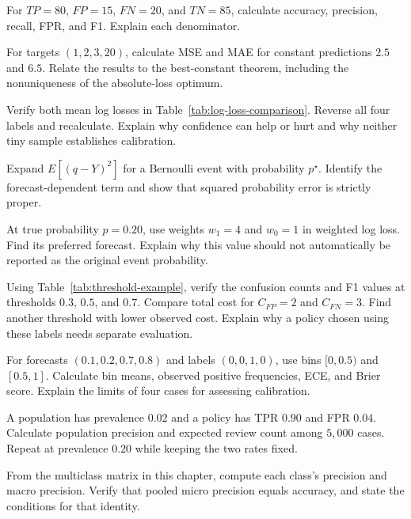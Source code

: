 \begin{exercises}
\item {}For $TP=80$, $FP=15$, $FN=20$, and $TN=85$, calculate accuracy, precision, recall, FPR, and F1. Explain each denominator.
\item {}For targets $(1,2,3,20)$, calculate MSE and MAE for constant predictions $2.5$ and $6.5$. Relate the results to the best-constant theorem, including the nonuniqueness of the absolute-loss optimum.
\item {}Verify both mean log losses in Table~\ref{tab:log-loss-comparison}. Reverse all four labels and recalculate. Explain why confidence can help or hurt and why neither tiny sample establishes calibration.
\item {}Expand $E[(q-Y)^2]$ for a Bernoulli event with probability $p^\star$. Identify the forecast-dependent term and show that squared probability error is strictly proper.
\item {}At true probability $p=0.20$, use weights $w_1=4$ and $w_0=1$ in weighted log loss. Find its preferred forecast. Explain why this value should not automatically be reported as the original event probability.
\item {}Using Table~\ref{tab:threshold-example}, verify the confusion counts and F1 values at thresholds $0.3$, $0.5$, and $0.7$. Compare total cost for $C_{FP}=2$ and $C_{FN}=3$. Find another threshold with lower observed cost. Explain why a policy chosen using these labels needs separate evaluation.
\item {}For forecasts $(0.1,0.2,0.7,0.8)$ and labels $(0,0,1,0)$, use bins $[0,0.5)$ and $[0.5,1]$. Calculate bin means, observed positive frequencies, ECE, and Brier score. Explain the limits of four cases for assessing calibration.
\item {}A population has prevalence $0.02$ and a policy has TPR $0.90$ and FPR $0.04$. Calculate population precision and expected review count among $5{,}000$ cases. Repeat at prevalence $0.20$ while keeping the two rates fixed.
\item {}From the multiclass matrix in this chapter, compute each class's precision and macro precision. Verify that pooled micro precision equals accuracy, and state the conditions for that identity.

\end{exercises}
